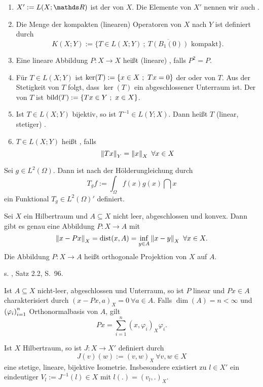 \begin{enumerate}[(1)]
	\item $X' := L(X;\R)$ ist der  von $X$.
	Die Elemente von $X'$ nennen wir auch .
	\item Die Menge der kompakten (linearen) Operatoren von $X$ nach $Y$ ist definiert durch
	\[
	K(X;Y) := \lbrace T\in L(X;Y)~;~ \overline{T(B_1(0))} \text{ kompakt} \rbrace.
	\]
	\item Eine lineare Abbildung $P:X\to X$ heißt (lineare) , falls $P^2=P$.
	\item Für $T\in L(X;Y)$ ist $\ker(T) := \left\{x\in X~;~ Tx = 0\right\}$ der  oder  von $T$.
	Aus der Stetigkeit von $T$ folgt, dass $\ker(T)$ ein abgeschlossener Unterraum ist.
	Der  von $T$ ist $\operatorname{bild}(T) := \left\{Tx\in Y~;~x\in X\right\}$.
	\item Ist $T\in L(X;Y)$ bijektiv, so ist $T^{-1}\in L(Y;X)$.
	Dann heißt $T$ (linear, stetiger) .
	\item $T\in L(X;Y)$ heißt , falls
	\[
	\left\Vert Tx\right\Vert_Y = \left\Vert x\right\Vert_X ~\forall x\in X
	\]
\end{enumerate}

Sei $g\in L^2(\Omega)$.
Dann ist nach der Hölderungleichung durch 
\[
T_g f := \int_{\Omega} f(x) g(x)\dint x
\]
ein Funktional $T_g\in  L^2(\Omega)'$ definiert.

Sei $X$ ein Hilbertraum und $A\subseteq X$ nicht leer, abgeschlossen und konvex.
Dann gibt es genau eine Abbildung $P:X\to A$ mit
\[
\left\Vert x-Px\right\Vert_X = \operatorname{dist}(x,A) = \inf\limits_{y\in A} \left\Vert x-y\right\Vert_X ~\forall x\in X.
\]
Die Abbildung $P:X\to A$ heißt orthogonale Projektion von $X$ auf $A$.

 s. \cite{Alt06}, Satz 2.2, S.~96.

Ist $A\subseteq X$ nicht-leer, abgeschlossen und Unterraum, so ist $P$ linear und $Px\in A$ charakterisiert durch $(x-Px,a)_X = 0~\forall a\in A$.
Falls $\dim(A) = n<\infty$ und $\left( \varphi_i\right)_{i=1}^n$ Orthonormalbasis von $A$, gilt
\[
Px = \sum_{i=1}^{n} (x, \varphi_i)_X\varphi_i.
\]

Ist $X$ Hilbertraum, so ist $J:X\to X'$ definiert durch
\[
J(v)(w) := (v,w)_X ~\forall v,w\in X 
\]
eine stetige, lineare, bijektive Isometrie.
Insbesondere existiert zu $l\in X'$ ein eindeutiger  $V_l := J^{-1}(l)\in X$ mit $l(.) = (v_l,.)_X$.\\

